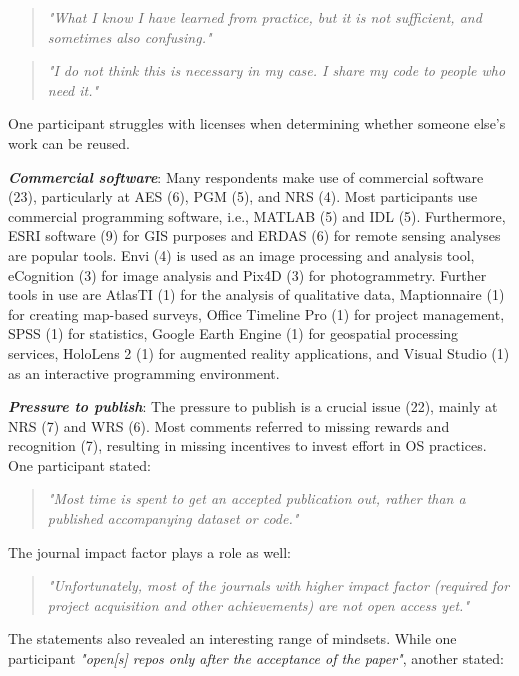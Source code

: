 \documentclass[gc, manuscript]{copernicus}
\begin{document}
\begin{quote}
\textit{"What I know I have learned from practice, but it is not sufficient, and sometimes also confusing."}
\end{quote}

\begin{quote}
\textit{"I do not think this is necessary in my case. I share my code to people who need it."}
\end{quote}

One participant struggles with licenses when determining whether someone
else's work can be reused.

\textit{\textbf{Commercial software}}: Many respondents make use of
commercial software (23), particularly at AES (6), PGM (5), and NRS (4).
Most participants use commercial programming software, i.e., MATLAB (5)
and IDL (5). Furthermore, ESRI software (9) for GIS purposes and ERDAS
(6) for remote sensing analyses are popular tools. Envi (4) is used as
an image processing and analysis tool, eCognition (3) for image analysis
and Pix4D (3) for photogrammetry. Further tools in use are AtlasTI (1)
for the analysis of qualitative data, Maptionnaire (1) for creating
map-based surveys, Office Timeline Pro (1) for project management, SPSS
(1) for statistics, Google Earth Engine (1) for geospatial processing
services, HoloLens 2 (1) for augmented reality applications, and Visual
Studio (1) as an interactive programming environment.

\textit{\textbf{Pressure to publish}}: The pressure to publish is a
crucial issue (22), mainly at NRS (7) and WRS (6). Most comments
referred to missing rewards and recognition (7), resulting in missing
incentives to invest effort in OS practices. One participant stated:

\begin{quote}
\textit{"Most time is spent to get an accepted publication out, rather than a published accompanying dataset or code."}
\end{quote}

The journal impact factor plays a role as well:

\begin{quote}
\textit{"Unfortunately, most of the journals with higher impact factor (required for project acquisition and other achievements) are not open access yet."}
\end{quote}

The statements also revealed an interesting range of mindsets. While one
participant
\textit{"open[s] repos only after the acceptance of the paper"}, another
stated:
\end{document}
